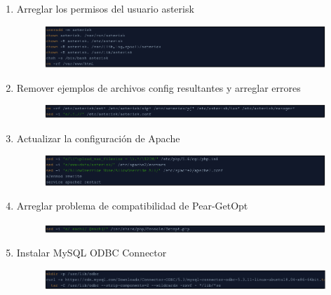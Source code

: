 \documentclass{article}
\begin{document}
\begin{enumerate}
  \item Arreglar los permisos del usuario asterisk
  \begin{figure}[!h]
    \centering
      \includegraphics[width=\columnwidth]{images/pbx-6.png}
    \label{fig:graph}
  \end{figure}

  \item Remover ejemplos de archivos config resultantes y arreglar errores
  \begin{figure}[!h]
    \centering
      \includegraphics[width=\columnwidth]{images/pbx-7.png}
    \label{fig:graph}
  \end{figure}
  
  \item Actualizar la configuraci\'on de Apache
  \begin{figure}[!h]
    \centering
      \includegraphics[width=\columnwidth]{images/pbx-8.png}
    \label{fig:graph}
  \end{figure}
  
  \item Arreglar problema de compatibilidad de Pear-GetOpt
  \begin{figure}[!h]
    \centering
      \includegraphics[width=\columnwidth]{images/pbx-9.png}
    \label{fig:graph}
  \end{figure}
  
  \item Instalar MySQL ODBC Connector
  \begin{figure}[!h]
    \centering
      \includegraphics[width=\columnwidth]{images/pbx-10.png}
    \label{fig:graph}
  \end{figure}
  

\end{enumerate}
\end{document}
